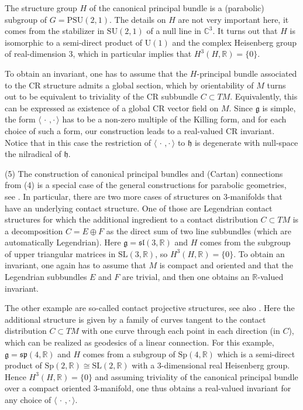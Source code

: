 \documentclass[british,11pt,a4paper]{amsart}
\numberwithin{equation}{section}
\renewcommand\frak{\mathfrak}
\newcommand{\B}[2]{\langle#1,#2\rangle}
\newcommand*{\R}{\mathbb{R}}
\numberwithin{theorem}{section}
\theoremstyle{definition}
\theoremstyle{remark}
\begin{document}
The structure group $H$ of the canonical principal bundle is a (parabolic) subgroup of $G=\mathrm{PSU}(2,1)$. The details on $H$ are not very important here, it comes from the stabilizer in $\mathrm{SU}(2,1)$ of a null line in $\mathbb C^3$. It turns out that $H$ is isomorphic to a semi-direct product of $\mathrm{U}(1)$ and the complex Heisenberg group of real-dimension $3$, which in particular implies that $H^3(H,\R)=\{0\}$.

To obtain an invariant, one has to assume that the $H$-principal bundle associated to the CR structure admits a global section, which by orientability of $M$ turns out to be equivalent to triviality of the CR subbundle $C\subset TM$. Equivalently, this can be expressed as existence of a global CR vector field on $M$. Since $\frak{g}$ is simple, the form $\B{\,\cdot\,}{\cdot\,}$ has to be a non-zero multiple of the Killing form, and for each choice of such a form, our construction leads to a real-valued CR invariant. Notice that in this case the restriction of $\B{\,\cdot\,}{\cdot\,}$ to $\frak{h}$ is degenerate with null-space the nilradical of $\frak{h}$.

\smallskip

(5) The construction of canonical principal bundles and (Cartan) connections from (4) is a special case of the general constructions for parabolic geometries, see \cite{MR2532439}. In particular, there are two more cases of structures on $3$-manifolds that have an underlying contact structure. One of those are Legendrian contact structures for which the additional ingredient to a contact distribution $C\subset TM$ is a decomposition $C=E\oplus F$ as the direct sum of two  line subbundles (which are automatically Legendrian). Here $\frak{g}=\frak{sl}(3,\R)$ and $H$ comes from the subgroup of upper triangular matrices in $\mathrm{SL}(3,\R)$, so $H^3(H,\R)=\{0\}$. To obtain an invariant, one again has to assume that $M$ is compact and oriented and that the Legendrian subbundles $E$ and $F$ are trivial, and then one obtains an $\R$-valued invariant.

The other example are so-called contact projective structures, see also \cite{MR2189678}. Here the additional structure is given by a family of curves tangent to the contact distribution $C\subset TM$ with one curve through each point in each direction (in $C$), which can be realized as geodesics of a linear connection. For this example, $\frak{g}=\frak{sp}(4,\R)$ and $H$ comes from a subgroup of $\mathrm{Sp}(4,\R)$ which is a semi-direct product of $\mathrm{Sp}(2,\R)\cong \mathrm{SL}(2,\R)$ with a $3$-dimensional real Heisenberg group. Hence $H^3(H,\R)=\{0\}$ and assuming triviality of the canonical principal bundle over a compact oriented $3$-manifold, one thus obtains a real-valued invariant for any choice of $\B{\,\cdot\,}{\cdot\,}$.
\end{document}
